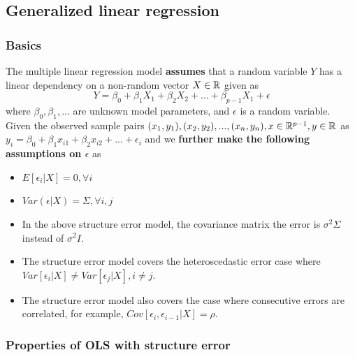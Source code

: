 \begin{refsection}
\begin{remark}[interpretation]
\end{remark}


\subsection{Generalized linear regression}
\subsubsection{Basics}
\begin{definition}\label{ch:regression-analysis:def:linearRegressionModelWithStructuralError}
	The multiple linear regression model \textbf{assumes} that a random variable $Y$ has a linear dependency on a non-random vector $X \in \mathbb{R}$ given as
	$$Y = \beta_0 + \beta_1 X_1 +\beta_2 X_2 + ... +\beta_{p-1} X_1 + \epsilon$$
	where $\beta_0,\beta_1, ...$ are unknown model parameters, and $\epsilon$ is a random variable. 
	Given the observed sample pairs $(x_1,y_1),(x_2,y_2),..., (x_n,y_n), x\in \mathbb{R}^{p-1}, y\in \mathbb{R}$ as $y_i = \beta_0 + \beta_1 x_{i1} + \beta_2 x_{i2} + ... + \epsilon_i$ and we \textbf{further make the following assumptions on $\epsilon$} as
	\begin{itemize}
		\item $E[\epsilon_i|X] = 0,\forall i$
		\item $Var(\epsilon|X) = \Sigma,\forall i,j$
	\end{itemize} 	
\end{definition}

\begin{remark}\hfill
\begin{itemize}
	\item In the above structure error model, the covariance matrix the error is $\sigma^2 \Sigma$ instead of $\sigma^2I$.
	\item The structure error model covers the heteroscedastic error case where $Var[\epsilon_i|X] \neq Var[\epsilon_j|X], i\neq j$.
	\item The structure error model also covers the case where consecutive errors are correlated, for example, $Cov[\epsilon_i,\epsilon_{i-1}|X] =\rho$.
\end{itemize}	
\end{remark}


\subsubsection{Properties of OLS with structure error}


\end{refsection}
